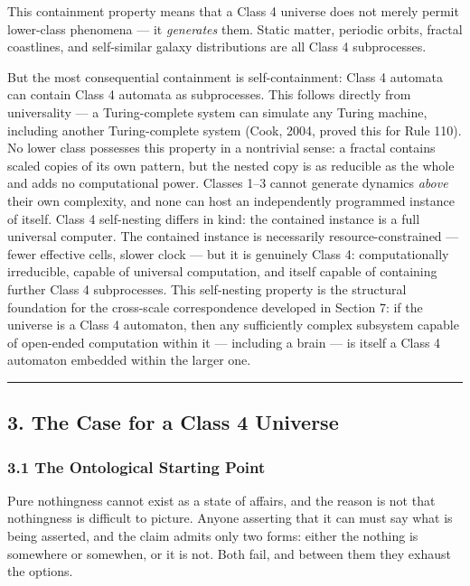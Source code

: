 \documentclass[
]{article}
\begin{document}
This containment property means that a Class 4 universe does not merely
permit lower-class phenomena --- it \emph{generates} them. Static
matter, periodic orbits, fractal coastlines, and self-similar galaxy
distributions are all Class 4 subprocesses.

But the most consequential containment is self-containment: Class 4
automata can contain Class 4 automata as subprocesses. This follows
directly from universality --- a Turing-complete system can simulate any
Turing machine, including another Turing-complete system (Cook, 2004,
proved this for Rule 110). No lower class possesses this property in a
nontrivial sense: a fractal contains scaled copies of its own pattern,
but the nested copy is as reducible as the whole and adds no
computational power. Classes 1--3 cannot generate dynamics \emph{above}
their own complexity, and none can host an independently programmed
instance of itself. Class 4 self-nesting differs in kind: the contained
instance is a full universal computer. The contained instance is
necessarily resource-constrained --- fewer effective cells, slower clock
--- but it is genuinely Class 4: computationally irreducible, capable of
universal computation, and itself capable of containing further Class 4
subprocesses. This self-nesting property is the structural foundation
for the cross-scale correspondence developed in Section 7: if the
universe is a Class 4 automaton, then any sufficiently complex subsystem
capable of open-ended computation within it --- including a brain --- is
itself a Class 4 automaton embedded within the larger one.

\begin{center}\rule{0.5\linewidth}{0.5pt}\end{center}

\hypertarget{the-case-for-a-class-4-universe}{%
\subsection{3. The Case for a Class 4
Universe}\label{the-case-for-a-class-4-universe}}

\hypertarget{the-ontological-starting-point}{%
\subsubsection{3.1 The Ontological Starting
Point}\label{the-ontological-starting-point}}

Pure nothingness cannot exist as a state of affairs, and the reason is
not that nothingness is difficult to picture. Anyone asserting that it
can must say what is being asserted, and the claim admits only two
forms: either the nothing is somewhere or somewhen, or it is not. Both
fail, and between them they exhaust the options.
\end{document}
